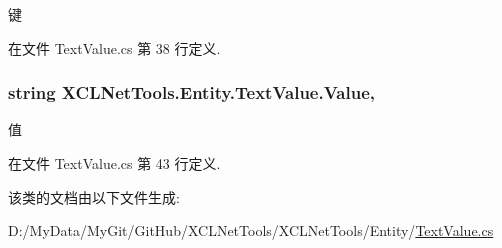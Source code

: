 键 



在文件 Text\-Value.\-cs 第 38 行定义.

\hypertarget{class_x_c_l_net_tools_1_1_entity_1_1_text_value_a8a193486b942adc898433bd29db3eff7}{
\subsubsection[{Value}]{\setlength{\rightskip}{0pt plus 5cm}string X\-C\-L\-Net\-Tools.\-Entity.\-Text\-Value.\-Value\hspace{0.3cm}{\ttfamily [get]}, {\ttfamily [set]}}}\label{class_x_c_l_net_tools_1_1_entity_1_1_text_value_a8a193486b942adc898433bd29db3eff7}


值 



在文件 Text\-Value.\-cs 第 43 行定义.



该类的文档由以下文件生成\-:\begin{DoxyCompactItemize}
\item 
D\-:/\-My\-Data/\-My\-Git/\-Git\-Hub/\-X\-C\-L\-Net\-Tools/\-X\-C\-L\-Net\-Tools/\-Entity/\hyperlink{_text_value_8cs}{Text\-Value.\-cs}\end{DoxyCompactItemize}
